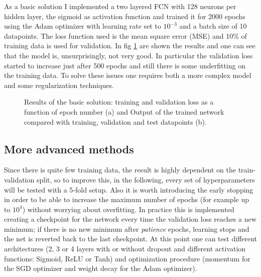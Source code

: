 \documentclass[a4paper, 11pt]{article}
\begin{document}
    As a basic solution I implemented a two layered FCN with 128 neurons per hidden layer, the sigmoid as activation function and trained it for 2000 epochs using the Adam optimizer with learning rate set to $10^{-3}$ and a batch size of 10 datapoints. The loss function used is the mean square error (MSE) and 10\% of training data is used for validation. In fig \ref{fig:r:basic} are shown the results and one can see that the model is, unsurprisingly, not very good. In particular the validation loss started to increase just after 500 epochs and still there is some underfitting on the training data.
    To solve these issues one requires both a more complex model and some regularization techniques.

    \begin{figure}
      \centering
       \quad
      \caption{Results of the basic solution: training and validation loss as a function of epoch number (a) and Output of the trained network compared with training, validation and test datapoints (b).}
      \label{fig:r:basic}
    \end{figure}

  \subsection{More advanced methods}
    Since there is quite few training data, the result is highly dependent on the train-validation split, so to improve this, in the following, every set of hyperparameters will be tested with a 5-fold setup.
    Also it is worth introducing the early stopping in order to be able to increase the maximum number of epochs (for example up to $10^4$) without worrying about overfitting. In practice this is implemented creating a checkpoint for the network every time the validation loss reaches a new minimum; if there is no new minimum after \emph{patience} epochs, learning stops and the net is reverted back to the last checkpoint.
    At this point one can test different architectures (2, 3 or 4 layers with or without dropout and different activation functions: Sigmoid, ReLU or Tanh) and optimization procedure (momentum for the SGD optimizer and weight decay for the Adam optimizer).
\end{document}
